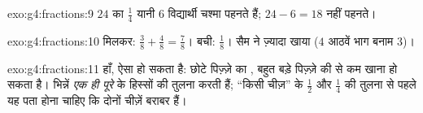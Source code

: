 \begin{solution}{exo:g4:fractions:9}
$24$ का $\frac14$ यानी $6$ विद्यार्थी चश्मा पहनते हैं;
$24 - 6 = 18$ नहीं पहनते।
\end{solution}

\begin{solution}{exo:g4:fractions:10}
मिलकर: $\frac38 + \frac48 = \frac78$। बची: $\frac18$। सैम ने
ज़्यादा खाया ($4$ आठवें भाग बनाम $3$)।
\end{solution}

\begin{solution}{exo:g4:fractions:11}
हाँ, ऐसा हो सकता है: छोटे पिज़्ज़े का , बहुत बड़े पिज़्ज़े की
 से कम खाना हो सकता है। भिन्नें \emph{एक ही पूरे} के
हिस्सों की तुलना करती हैं; ``किसी चीज़'' के $\frac12$ और
$\frac14$ की तुलना से पहले यह पता होना चाहिए कि दोनों चीज़ें बराबर हैं।
\end{solution}
